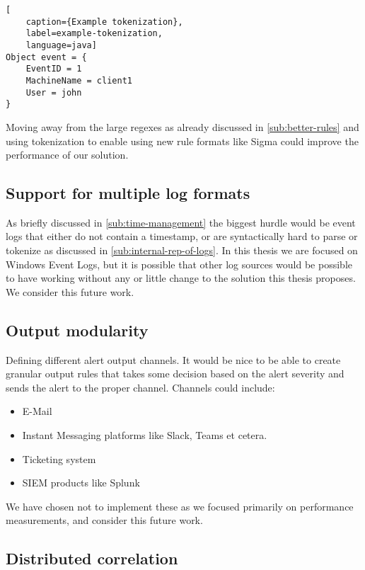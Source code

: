 \begin{lstlisting}[
    caption={Example tokenization},
    label=example-tokenization,
    language=java]
Object event = {
    EventID = 1
    MachineName = client1
    User = john
}
\end{lstlisting}

Moving away from the large regexes as already discussed in \cref{sub:better-rules} and using tokenization to enable using new rule formats like Sigma could improve the performance of our solution.

\subsection{Support for multiple log formats}
\label{sub:multiple-log-formats}

As briefly discussed in \cref{sub:time-management} the biggest hurdle would be event logs that either do not contain a timestamp, or are syntactically hard to parse or tokenize as discussed in \cref{sub:internal-rep-of-logs}.
In this thesis we are focused on Windows Event Logs, but it is possible that other log sources would be possible to have working without any or little change to the solution this thesis proposes. We consider this future work.

\subsection{Output modularity}
\label{sub:modularity}

Defining different alert output channels. It would be nice to be able to create granular output rules that takes some decision based on the alert severity and sends the alert to the proper channel. Channels could include:

\begin{itemize}
    \item E-Mail
    \item Instant Messaging platforms like Slack, Teams et cetera.
    \item Ticketing system
    \item SIEM products like Splunk
\end{itemize}
We have chosen not to implement these as we focused primarily on performance measurements, and consider this future work.

\subsection{Distributed correlation}
\label{sub:distributed-correlation}

